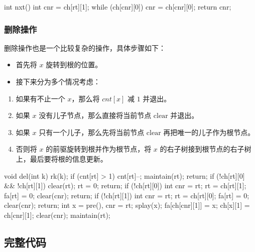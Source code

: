 \begin{cppcode}
int nxt() {
  int cnr = ch[rt][1];
  while (ch[cnr][0]) cnr = ch[cnr][0];
  return cnr;
}
\end{cppcode}

\subsubsection{删除操作}

删除操作也是一个比较复杂的操作，具体步骤如下：

\begin{itemize}
\item 首先将 $x$ 旋转到根的位置。
\item 接下来分为多个情况考虑：
\end{itemize}

\begin{enumerate}
\item 如果有不止一个 $x$，那么将 $cnt[x]$ 减 $1$ 并退出。
\item 如果 $x$ 没有儿子节点，那么直接将当前节点 $\text{clear}$ 并退出。
\item 如果 $x$ 只有一个儿子，那么先将当前节点 $\text{clear}$ 再把唯一的儿子作为根节点。
\item 否则将 $x$ 的前驱旋转到根并作为根节点，将 $x$ 的右子树接到根节点的右子树上，最后要将根的信息更新。
\end{enumerate}

\begin{cppcode}
void del(int k) {
  rk(k);
  if (cnt[rt] > 1) {
    cnt[rt]--;
    maintain(rt);
    return;
  }
  if (!ch[rt][0] && !ch[rt][1]) {
    clear(rt);
    rt = 0;
    return;
  }
  if (!ch[rt][0]) {
    int cnr = rt;
    rt = ch[rt][1];
    fa[rt] = 0;
    clear(cnr);
    return;
  }
  if (!ch[rt][1]) {
    int cnr = rt;
    rt = ch[rt][0];
    fa[rt] = 0;
    clear(cnr);
    return;
  }
  int x = pre(), cnr = rt;
  splay(x);
  fa[ch[cnr][1]] = x;
  ch[x][1] = ch[cnr][1];
  clear(cnr);
  maintain(rt);
}
\end{cppcode}

\hr

\subsection{完整代码}

